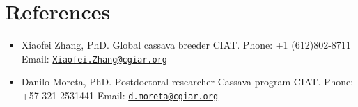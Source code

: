 \documentclass[11pt,a4paper,]{awesome-cv}
\begin{document}
\hypertarget{references}{%
\section{References}\label{references}}

\begin{itemize}
\item
  Xiaofei Zhang, PhD. Global cassava breeder CIAT. Phone: +1
  (612)802-8711 Email:
  \href{mailto:Xiaofei.Zhang@cgiar.org}{\nolinkurl{Xiaofei.Zhang@cgiar.org}}
\item
  Danilo Moreta, PhD. Postdoctoral researcher Cassava program CIAT.
  Phone: +57 321 2531441 Email:
  \href{mailto:d.moreta@cgiar.org}{\nolinkurl{d.moreta@cgiar.org}}
\end{itemize}


\label{LastPage}~
\end{document}
